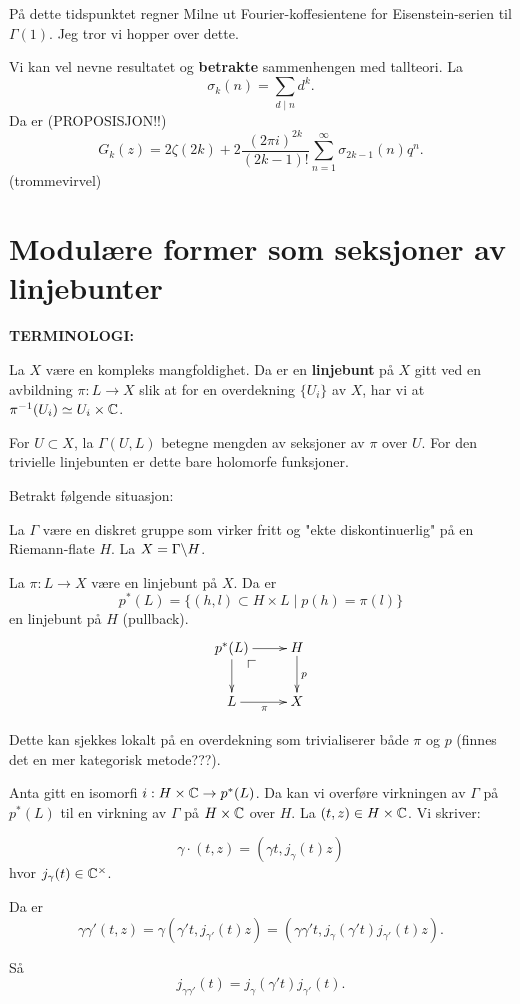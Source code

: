 \documentclass[11pt, english]{article}
\begin{document}
På dette tidspunktet regner Milne ut Fourier-koffesientene for Eisenstein-serien til $\Gamma(1)$. Jeg tror vi hopper over dette.

Vi kan vel nevne resultatet og \textbf{betrakte} sammenhengen med tallteori. La 
$$
\sigma_k(n) = \sum_{d \mid n} d^k.
$$
Da er (PROPOSISJON!!)
\[
G_k(z) = 2\zeta(2k) + 2\frac{(2\pi i) ^{2k}}{(2k-1)!} \sum_{n=1}^\infty \sigma_{2k-1}(n) q^n.
\]
(trommevirvel)


\section{Modulære former som seksjoner av linjebunter}

\textbf{TERMINOLOGI:}

La $X$ være en kompleks mangfoldighet. Da er en \textbf{linjebunt} på $X$ gitt ved en avbildning $\pi:L \to X$ slik at for en overdekning $\{ U_i \}$ av $X$, har vi at $\pi^{-1}(U_i) \simeq U_i \times \mathbb{C}$. 

For $U \subset X$, la  $\Gamma(U,L)$ betegne mengden av seksjoner av $\pi$ over $U$. For den trivielle linjebunten er dette bare holomorfe funksjoner.

Betrakt følgende situasjon:

La $\Gamma$ være en diskret gruppe som virker fritt og "ekte diskontinuerlig" på en Riemann-flate $H$. La $X = \Gamma \backslash H$.

La $\pi:L \to X$ være en linjebunt på $X$. Da er 
$$
p^\ast (L) = \{ (h,l) \subset H \times L \mid p(h) = \pi(l) \}
$$
en linjebunt på $H$ (pullback).
\[
\xymatrix{
p^\ast (L) \pullbackcorner \ar[r] \ar[d] & H \ar[d]^p \\
L \ar[r]_\pi & X
}
\]

Dette kan sjekkes lokalt på en overdekning som trivialiserer både $\pi$ og $p$ (finnes det en mer kategorisk metode???). 

Anta gitt en isomorfi $i: H \times \mathbb{C} \to p^\ast (L)$. Da kan vi overføre virkningen av $\Gamma$ på $p^\ast (L)$ til en virkning av $\Gamma$ på $H \times \mathbb{C}$ over $H$.  La $(t,z) \in H \times \mathbb{C}$. Vi skriver:

$$
\gamma \cdot (t,z) = \left( \gamma t , j_\gamma(t)z \right)
$$
hvor $j_\gamma(t) \in \mathbb{C}^\times$. 

Da er 
$$
\gamma \gamma' (t,z) = \gamma(\gamma' t, j_{\gamma '}(t)z ) = (\gamma \gamma' t, j_{\gamma}(\gamma' t) j_{\gamma'}(t) z).
$$

Så
$$
j_{\gamma \gamma'}(t) = j_\gamma(\gamma' t) j_{\gamma'}(t).
$$
\end{document}
